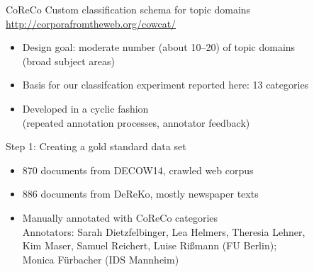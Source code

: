 \documentclass{beamer}
\begin{document}
\begin{frame}
  {CoReCo}
%
    Custom classification schema for topic domains\\
    \footnotesize{\url{http://corporafromtheweb.org/cowcat/}}

    \begin{itemize}
    \item Design goal: moderate number (about 10--20) of topic domains\\
    (broad subject areas)
    \item Basis for our classifcation experiment reported here: 13 categories
    \item Developed in a cyclic fashion\\
    (repeated annotation processes, annotator feedback)
  \end{itemize}
\end{frame}

\begin{frame}
  {Step 1: Creating a gold standard data set}
  \begin{itemize}
    \item 870 documents from \alert{DECOW14}, crawled \alert{web} corpus\\
    \citep{SchaeferBildhauer2012a,Schaefer2015b}
    \item 886 documents from \alert{DeReKo}, mostly \alert{newspaper} texts\\
    \citep{KupietzEa2010}
    \item Manually annotated with CoReCo categories\\
      \vspace{0.5cm}
    {\footnotesize Annotators: Sarah Dietzfelbinger, Lea Helmers, Theresia Lehner,\\
    Kim Maser, Samuel Reichert, Luise Rißmann (FU Berlin);\\
  Monica Fürbacher (IDS Mannheim)}
  \end{itemize}
\end{frame}
\end{document}

